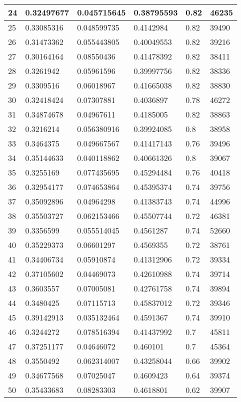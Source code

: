 \begin{longtable}{|l|l|l|l|l|l|}
24 & 0.32497677 & 0.045715645 & 0.38795593 & 0.82 & 46235 \\ \hline 
25 & 0.33085316 & 0.048599735 & 0.4142984 & 0.82 & 39490 \\ \hline 
26 & 0.31473362 & 0.055443805 & 0.40049553 & 0.82 & 39216 \\ \hline 
27 & 0.30164164 & 0.08550436 & 0.41478392 & 0.82 & 38411 \\ \hline 
28 & 0.3261942 & 0.05961596 & 0.39997756 & 0.82 & 38336 \\ \hline 
29 & 0.3309516 & 0.06018967 & 0.41665038 & 0.82 & 38830 \\ \hline 
30 & 0.32418424 & 0.07307881 & 0.4036897 & 0.78 & 46272 \\ \hline 
31 & 0.34874678 & 0.04967611 & 0.4185005 & 0.82 & 38863 \\ \hline 
32 & 0.3216214 & 0.056380916 & 0.39924085 & 0.8 & 38958 \\ \hline 
33 & 0.3464375 & 0.049667567 & 0.41417143 & 0.76 & 39496 \\ \hline 
34 & 0.35144633 & 0.040118862 & 0.40661326 & 0.8 & 39067 \\ \hline 
35 & 0.3255169 & 0.077435695 & 0.45294484 & 0.76 & 40418 \\ \hline 
36 & 0.32954177 & 0.074653864 & 0.45395374 & 0.74 & 39756 \\ \hline 
37 & 0.35092896 & 0.04964298 & 0.41383743 & 0.74 & 44996 \\ \hline 
38 & 0.35503727 & 0.062153466 & 0.45507744 & 0.72 & 46381 \\ \hline 
39 & 0.3356599 & 0.055514045 & 0.4561287 & 0.74 & 52660 \\ \hline 
40 & 0.35229373 & 0.06601297 & 0.4569355 & 0.72 & 38761 \\ \hline 
41 & 0.34406734 & 0.05910874 & 0.41312906 & 0.72 & 39334 \\ \hline 
42 & 0.37105602 & 0.04469073 & 0.42610988 & 0.74 & 39714 \\ \hline 
43 & 0.3603557 & 0.07005081 & 0.42761758 & 0.74 & 39894 \\ \hline 
44 & 0.3480425 & 0.07115713 & 0.45837012 & 0.72 & 39346 \\ \hline 
45 & 0.39142913 & 0.035132464 & 0.4591367 & 0.74 & 39910 \\ \hline 
46 & 0.3244272 & 0.078516394 & 0.41437992 & 0.7 & 45811 \\ \hline 
47 & 0.37251177 & 0.04646072 & 0.460101 & 0.7 & 45364 \\ \hline 
48 & 0.3550492 & 0.062314007 & 0.43258044 & 0.66 & 39902 \\ \hline 
49 & 0.34677568 & 0.07025047 & 0.4609423 & 0.64 & 39374 \\ \hline 
50 & 0.35433683 & 0.08283303 & 0.4618801 & 0.62 & 39907 \\ \hline 
\end{longtable}